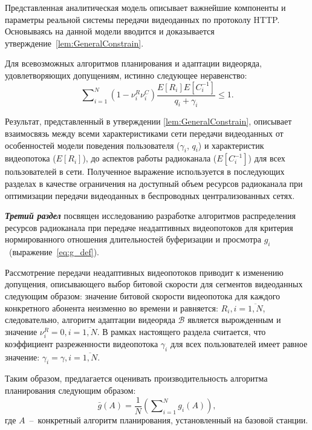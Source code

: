 Представленная аналитическая модель описывает важнейшие компоненты и параметры реальной системы передачи видеоданных по протоколу HTTP. Основываясь на данной модели вводится и доказывается утверждение~\ref{lem:GeneralConstrain}.

\begin{lemma}
\label{lem:GeneralConstrain}
Для всевозможных алгоритмов планирования и адаптации видеоряда, удовлетворяющих допущениям, истинно следующее неравенство:
\emph{
\begin{equation}
	\label{eq:GeneralConstrain}
	\nonumber
	\sum\nolimits_{i=1}^{N} {\left(1-\nu^R_i\nu^C_i\right)\frac{E[R_i]E[C_i^{-1}]}{q_i + \gamma_i}} \leq 1.
\end{equation}
}
\end{lemma}

Результат, представленный в утверждении \ref{lem:GeneralConstrain}, описывает взаимосвязь между всеми характеристиками сети передачи видеоданных от особенностей модели поведения пользователя ($\gamma_i$, $q_i$) и характеристик видеопотока ($E[R_i]$), до аспектов работы радиоканала ($E[C_i^{-1}]$) для всех пользователей в сети. Полученное выражение используется в последующих разделах в качестве ограничения на доступный объем ресурсов радиоканала при оптимизации передачи видеоданных в беспроводных централизованных сетях.

\textbf{\textit{Третий раздел}} посвящен исследованию разработке алгоритмов распределения ресурсов радиоканала при передаче неадаптивных видеопотоков для критерия нормированного отношения длительностей буферизации и просмотра \mbox{$g_i$ (выражение \ref{eq:g_def})}.

Рассмотрение передачи неадаптивных видеопотоков приводит к изменению допущения, описывающего выбор битовой скорости для сегментов видеоданных следующим образом: значение битовой скорости видеопотока для каждого конкретного абонента неизменно во времени и равняется: $R_i, i=\overline{1,N}$, следовательно, алгоритм адаптации видеоряда $\mathcal{B}$ является вырожденным и значение $\nu^R_i = 0, i = \overline{1,N}$. В рамках настоящего раздела считается, что коэффициент разреженности видеопотока $\gamma_i$ для всех пользователей имеет равное значение: $\gamma_i = \gamma, i=\overline{1,N}$.

Таким образом, предлагается оценивать производительность алгоритма планирования следующим образом:
$$\bar{g}\left(A\right) = \frac{1}{N}\left(\sum\nolimits_{i=1}^{N} {g_i\left(A\right)}\right),$$
где $A$~--~конкретный алгоритм планирования, установленный на базовой станции.

